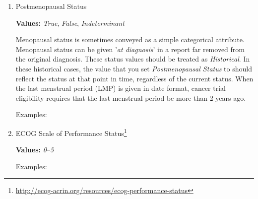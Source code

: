 \documentclass[letterpaper]{article}
\newcommand{\prefixDeep}[3]{%
  #1 %
  \tikz[baseline={([yshift={-\ht\strutbox}]a\x.north)},outer sep=0pt,inner sep=0pt]{%
    \node[align=center] (a\x) {%
      \strut \hl{#2}};%
  } %
  #3
}
\newcommand{\suffixDeep}{%
  \tikz[overlay]{ \draw[<->,thick] (b\x.west) -| (a\x.south); }%
  \pgfmathparse{int(\x+1)}%
  \xdef\x{\pgfmathresult}%
}
\newcommand{\twoDeep}[4]{%
  \begin{flushright}
  \tikz{
    \node[attrbox,align=right] (b\x) {%
      #1:  #2\\%
      #3:  #4%
    };%
  }
  \end{flushright}
  \suffixDeep
}
\newcommand{\menopause}[2]{\twoDeep{Postmenopausal Status}{#1}{Historical}{#2}}
\newcommand{\ecog}[2]{\twoDeep{ECOG}{#1}{Historical}{#2}}
\begin{document}
\begin{enumerate}
\item
  Postmenopausal Status

  \textbf{Values:}  \textsl{True}, \textsl{False}, \textsl{Indeterminant}
  
  Menopausal status is sometimes conveyed as a simple categorical attribute.
  Menopausal status can be given '\textsl{at diagnosis}' in a report far removed from the original diagnosis.
  These status values should be treated as \textsl{Historical}.
  In these historical cases, the value that you set \textsl{Postmenopausal Status} to should reflect the status at that point in time, regardless of the current status.
  When the last menstrual period (LMP) is given in date format, cancer trial eligibility requires that the last menstrual period be more than 2 years ago.

  Examples:

\item
  ECOG Scale of Performance Status\footnote{\url{http://ecog-acrin.org/resources/ecog-performance-status}}
  
  \textbf{Values:}  \textsl{0}--\textsl{5}
  
  Examples:
  

\end{enumerate}
\end{document}
